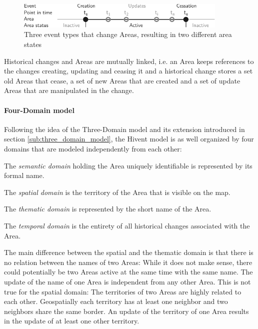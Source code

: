 \begin{figure}[H]
  \vspace{1em}
  \centering
  \includegraphics[width=0.9\textwidth]{graphics/development/hivent_model/area_states}
  \caption{Three event types that change Areas, resulting in two different area states}
  \label{fig:area_states}
\end{figure}

Historical changes and Areas are mutually linked, i.e. an Area keeps references to the changes creating, updating and ceasing it and a historical change stores a set old Areas that cease, a set of new Areas that are created and a set of update Areas that are manipulated in the change.


\paragraph{Four-Domain model} %
\label{par:four_domain_model}

Following the idea of the Three-Domain model and its extension introduced in section \ref{sub:three_domain_model}, the Hivent model is as well organized by four domains that are modeled independently from each other:

\begin{compactitem}
  \item The \emph{semantic domain} holding the Area uniquely identifiable is represented by its formal name.
  \item The \emph{spatial domain} is the territory of the Area that is visible on the map.
  \item The \emph{thematic domain} is represented by the short name of the Area.
  \item The \emph{temporal domain} is the entirety of all historical changes associated with the Area.
\end{compactitem}

The main difference between the spatial and the thematic domain is that there is no relation between the names of two Areas: While it does not make sense, there could potentially be two Areas active at the same time with the same name. The update of the name of one Area is independent from any other Area. This is not true for the spatial domain: The territories of two Areas are highly related to each other. Geospatially each territory has at least one neighbor and two neighbors share the same border. An update of the territory of one Area results in the update of at least one other territory.

